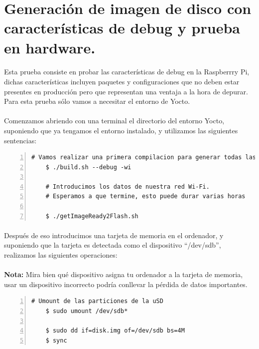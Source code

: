 \section{Generación de imagen de disco con características de debug y prueba en hardware.}

\paragraph{}Esta prueba consiste en probar las características de debug en la
Raspberrry Pi, dichas características incluyen paquetes y configuraciones que no deben
estar presentes en producción pero que representan una ventaja a la hora de depurar.
Para esta prueba sólo vamos a necesitar el entorno de Yocto.

\paragraph{}Comenzamos abriendo con una terminal el directorio del entorno Yocto,
suponiendo que ya tengamos el entorno instalado, y utilizamos las siguientes sentencias:

\begin{lstlisting}[style=consola, numbers=left]
    # Vamos realizar una primera compilacion para generar todas las tools del SDK
    $ ./build.sh --debug -wi

    # Introducimos los datos de nuestra red Wi-Fi.
    # Esperamos a que termine, esto puede durar varias horas

    $ ./getImageReady2Flash.sh
\end{lstlisting}

\paragraph{}Después de eso introducimos una tarjeta de memoria en el ordenador, y
suponiendo que la tarjeta es detectada como el dispositivo ``/dev/sdb'', realizamos
las siguientes operaciones:

\paragraph{}\textbf{Nota:} Mira bien qué dispositivo asigna tu ordenador a la tarjeta
de memoria, usar un dispositivo incorrecto podría conllevar la pérdida de datos
importantes.

\begin{lstlisting}[style=consola, numbers=left]
    # Umount de las particiones de la uSD
    $ sudo umount /dev/sdb*

    $ sudo dd if=disk.img of=/dev/sdb bs=4M
    $ sync
\end{lstlisting}

